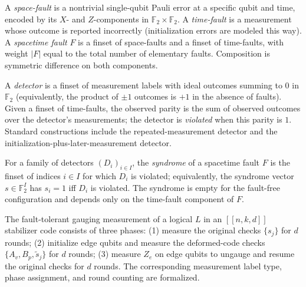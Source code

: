 \begin{definition}
\label{def:7_space_time_faults}
\leanok
A \emph{space-fault} is a nontrivial single-qubit Pauli error at a specific qubit and time,
encoded by its $X$- and $Z$-components in $\mathbb{F}_2 \times \mathbb{F}_2$. A
\emph{time-fault} is a measurement whose outcome is reported incorrectly (initialization
errors are modeled this way). A \emph{spacetime fault} $F$ is a finset of space-faults and a
finset of time-faults, with weight $|F|$ equal to the total number of elementary faults.
Composition is symmetric difference on both components.
\end{definition}

\begin{definition}[Detectors]
\label{def:8_detectors}
\leanok
A \emph{detector} is a finset of measurement labels with ideal outcomes summing to $0$ in
$\mathbb{F}_2$ (equivalently, the product of $\pm 1$ outcomes is $+1$ in the absence of
faults). Given a finset of time-faults, the observed parity is the sum of observed outcomes
over the detector's measurements; the detector is \emph{violated} when this parity is $1$.
Standard constructions include the repeated-measurement detector and the
initialization-plus-later-measurement detector.
\end{definition}

\begin{definition}[Syndrome]
\label{def:9_syndrome}
\leanok
For a family of detectors $(D_i)_{i \in I}$, the \emph{syndrome} of a spacetime fault $F$ is
the finset of indices $i \in I$ for which $D_i$ is violated; equivalently, the
syndrome vector $s \in \mathbb{F}_2^I$ has $s_i = 1$ iff $D_i$ is violated. The syndrome is
empty for the fault-free configuration and depends only on the time-fault component of $F$.
\end{definition}

\begin{definition}
\label{def:10_ft_gauging_procedure}
\leanok
The fault-tolerant gauging measurement of a logical $L$ in an $[[n,k,d]]$ stabilizer code
consists of three phases: (1) measure the original checks $\{s_j\}$ for $d$ rounds; (2)
initialize edge qubits and measure the deformed-code checks $\{A_v, B_p, \tilde s_j\}$ for
$d$ rounds; (3) measure $Z_e$ on edge qubits to ungauge and resume the original checks for
$d$ rounds. The corresponding measurement label type, phase assignment, and round counting
are formalized.
\end{definition}

